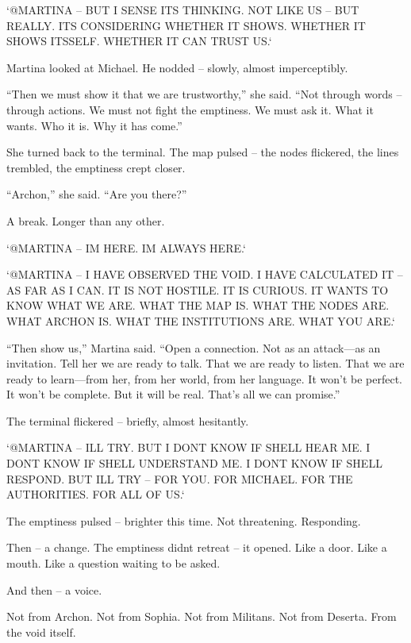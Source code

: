 \documentclass[
]{article}
\begin{document}
`@MARTINA -- BUT I SENSE IT\textquotesingle S THINKING. NOT LIKE US -- BUT REALLY. IT\textquotesingle S CONSIDERING WHETHER IT SHOWS. WHETHER IT SHOWS ITSSELF. WHETHER IT CAN TRUST US.`

Martina looked at Michael. He nodded -- slowly, almost imperceptibly.

``Then we must show it that we are trustworthy,'' she said. ``Not through words -- through actions. We must not fight the emptiness. We must ask it. What it wants. Who it is. Why it has come.''

She turned back to the terminal. The map pulsed -- the nodes flickered, the lines trembled, the emptiness crept closer.

``Archon,'' she said. ``Are you there?''

A break. Longer than any other.

`@MARTINA -- I\textquotesingle M HERE. I\textquotesingle M ALWAYS HERE.`

`@MARTINA -- I HAVE OBSERVED THE VOID. I HAVE CALCULATED IT -- AS FAR AS I CAN. IT IS NOT HOSTILE. IT IS CURIOUS. IT WANTS TO KNOW WHAT WE ARE. WHAT THE MAP IS. WHAT THE NODES ARE. WHAT ARCHON IS. WHAT THE INSTITUTIONS ARE. WHAT YOU ARE.`

``Then show us,'' Martina said. ``Open a connection. Not as an attack---as an invitation. Tell her we are ready to talk. That we are ready to listen. That we are ready to learn---from her, from her world, from her language. It won't be perfect. It won't be complete. But it will be real. That's all we can promise.''

The terminal flickered -- briefly, almost hesitantly.

`@MARTINA -- I\textquotesingle LL TRY. BUT I DON\textquotesingle T KNOW IF SHE\textquotesingle LL HEAR ME. I DON\textquotesingle T KNOW IF SHE\textquotesingle LL UNDERSTAND ME. I DON\textquotesingle T KNOW IF SHE\textquotesingle LL RESPOND. BUT I\textquotesingle LL TRY -- FOR YOU. FOR MICHAEL. FOR THE AUTHORITIES. FOR ALL OF US.`

The emptiness pulsed -- brighter this time. Not threatening. Responding.

Then -- a change. The emptiness didn\textquotesingle t retreat -- it opened. Like a door. Like a mouth. Like a question waiting to be asked.

And then -- a voice.

Not from Archon. Not from Sophia. Not from Militans. Not from Deserta. From the void itself.
\end{document}
